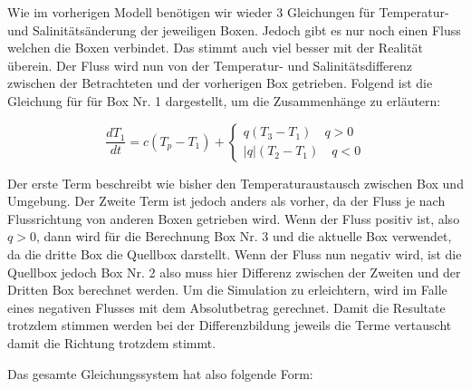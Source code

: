 Wie im vorherigen Modell benötigen wir wieder 3 Gleichungen für Temperatur- und Salinitätsänderung der jeweiligen Boxen.
Jedoch gibt es nur noch einen Fluss welchen die Boxen verbindet. Das stimmt auch viel besser mit der Realität überein. Der Fluss wird nun von der Temperatur- und Salinitätsdifferenz zwischen der Betrachteten und der vorherigen Box getrieben. Folgend ist die Gleichung für für Box Nr. 1 dargestellt, um die Zusammenhänge zu erläutern:

\begin{equation}
\frac{dT_1}{dt} = c(T_p-T_1)+ \begin{cases} q(T_3-T_1)  \quad q>0 \\ |q|(T_2-T_1)  \quad q<0 \end{cases}
\end{equation}

Der erste Term beschreibt wie bisher den Temperaturaustausch zwischen Box und Umgebung. Der Zweite Term ist jedoch anders als vorher, da der Fluss je nach Flussrichtung von anderen Boxen getrieben wird. 
Wenn der Fluss positiv ist, also $q>0$, dann wird für die Berechnung Box Nr. 3 und die aktuelle Box verwendet, da die dritte Box die Quellbox darstellt. Wenn der Fluss nun negativ wird, ist die Quellbox jedoch Box Nr. 2 also muss hier Differenz zwischen der Zweiten und der Dritten Box berechnet werden. Um die Simulation zu erleichtern, wird im Falle eines negativen Flusses mit dem Absolutbetrag gerechnet. Damit die Resultate trotzdem stimmen werden  bei der Differenzbildung jeweils die Terme vertauscht damit die Richtung trotzdem stimmt. 

Das gesamte Gleichungssystem hat also folgende Form:

